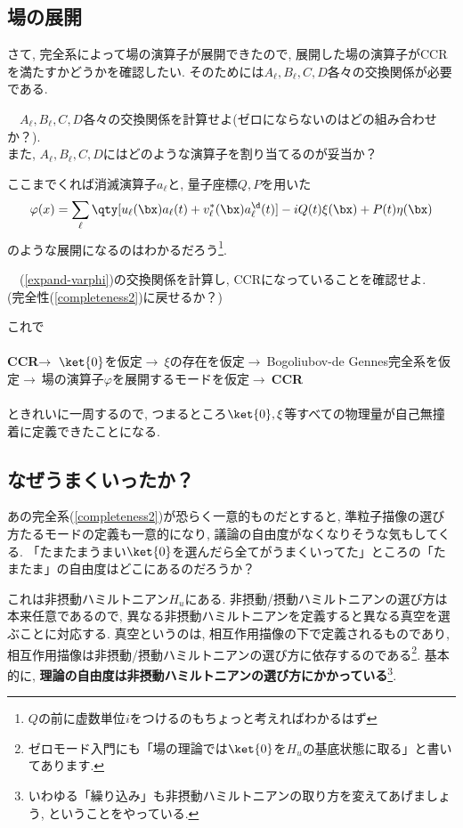\documentclass[10.5pt,a4paper]{jreport}
\begin{document}
\subsection{場の展開}
さて, 完全系によって場の演算子が展開できたので, 展開した場の演算子がCCRを満たすかどうかを確認したい. そのためには$A_\ell, B_\ell, C, D$各々の交換関係が必要である. 
\begin{screen}
  \ \ $A_\ell, B_\ell, C, D$各々の交換関係を計算せよ(ゼロにならないのはどの組み合わせか？). \\
  また, $A_\ell, B_\ell, C, D$にはどのような演算子を割り当てるのが妥当か？
\end{screen}
ここまでくれば消滅演算子$a_\ell$と, 量子座標$Q, P$を用いた
\begin{eqnarray}
  \varphi(x) = \sum_\ell \qty[u_\ell(\bx) a_\ell(t) + v^*_\ell(\bx) a^\d_\ell(t)]  -iQ(t)\xi(\bx) + P(t)\eta(\bx)\label{expand-varphi}
\end{eqnarray}
のような展開になるのはわかるだろう\footnote{$Q$の前に虚数単位$i$をつけるのもちょっと考えればわかるはず}.
\begin{screen}
  \ \ (\ref{expand-varphi})の交換関係を計算し, CCRになっていることを確認せよ. \\
  (完全性(\ref{completeness2})に戻せるか？)
\end{screen}
これで
\\\\
\textbf{CCR}$\rightarrow\ \ket{0}$を仮定$\rightarrow\ \xi$の存在を仮定$\rightarrow\ $Bogoliubov-de Gennes完全系を仮定$\rightarrow\ $場の演算子$\varphi$を展開するモードを仮定$\rightarrow\ $\textbf{CCR}
\\\\
ときれいに一周するので, つまるところ$\ket{0}, \xi$等すべての物理量が自己無撞着に定義できたことになる.
\subsection{なぜうまくいったか？}
あの完全系(\ref{completeness2})が恐らく一意的ものだとすると, 準粒子描像の選び方たるモードの定義も一意的になり, 議論の自由度がなくなりそうな気もしてくる. 「たまたまうまい$\ket{0}$を選んだら全てがうまくいってた」ところの「たまたま」の自由度はどこにあるのだろうか？

これは非摂動ハミルトニアン$H_u$にある. 非摂動/摂動ハミルトニアンの選び方は本来任意であるので, 異なる非摂動ハミルトニアンを定義すると異なる真空を選ぶことに対応する. 真空というのは, 相互作用描像の下で定義されるものであり, 相互作用描像は非摂動/摂動ハミルトニアンの選び方に依存するのである\footnote{ゼロモード入門にも「場の理論では$\ket{0}$を$H_u$の基底状態に取る」と書いてあります. }. 基本的に, \textbf{理論の自由度は非摂動ハミルトニアンの選び方にかかっている}\footnote{いわゆる「繰り込み」も非摂動ハミルトニアンの取り方を変えてあげましょう, ということをやっている. }.
\end{document}
